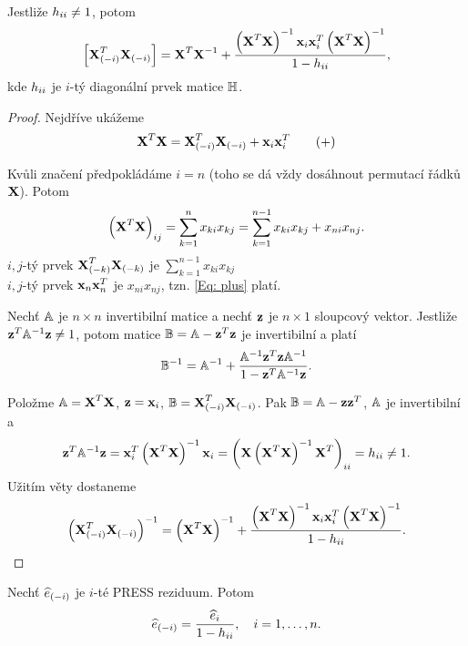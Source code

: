 \newcommand{\XtX}{\left( \X^T \X \right)^{-1}}

\begin{theorem}
Jestliže $h_{ii} \neq 1$, potom
$$
\left[ \Xmi^T \Xmi \right] = \X^T \inv{\X} + \frac{\XtX \x_i \x_i^T \XtX}{1 - \hii},
$$
kde $h_{ii}$ je $i$-tý diagonální prvek matice $\mathbb{H}$.
\end{theorem}

\begin{proof}
Nejdříve ukážeme
\begin{equation*}
	\textbf{X}^T \textbf{X} = \textbf{X}_{(-i)}^T \textbf{X}_{(-i)} + \textbf{x}_i \textbf{x}_i^T \tag{+} \label{Eq: plus}
\end{equation*}

\newcommand{\sumkn}{\sum_{k=1}^n}
\newcommand{\sumknn}{\sum_{k=1}^{n-1}}

Kvůli značení předpokládáme $i = n$ (toho se dá vždy dosáhnout permutací řádků $\textbf{X}$). Potom
$$
\left( \X^T \X \right)_{ij} = \sumkn x_{ki} x_{kj} = \sumknn x_{ki} x_{kj} + x_{ni} x_{nj}.
$$
$i,j$-tý prvek $\textbf{X}_{(-k)}^T \textbf{X}_{(-k)}$ je $\sumknn x_{ki} x_{kj}$ \\
$i,j$-tý prvek $\textbf{x}_n \textbf{x}_n^T$ je $x_{ni} x_{nj}$, tzn. \eqref{Eq: plus} platí.



\begin{theorem}
Nechť $\mathbb{A}$ je $n \times n$ invertibilní matice a nechť $\textbf{z}$ je $n \times 1$ sloupcový vektor. Jestliže $\textbf{z}^T \mathbb{A}^{-1} \textbf{z} \neq 1$, potom matice $\mathbb{B} = \mathbb{A} - \textbf{z}^T \textbf{z}$ je invertibilní a platí
$$
\mathbb{B}^{-1} = \mathbb{A}^{-1} + \frac{\mathbb{A}^{-1} \textbf{z}^T \textbf{z} \mathbb{A}^{-1}}{1 - \textbf{z}^T \mathbb{A}^{-1} \textbf{z}}.
$$
\end{theorem}

Položme $\mathbb{A} = \textbf{X}^T \textbf{X}$, $\textbf{z} = \textbf{x}_i$, $\mathbb{B} = \textbf{X}_{(-i)}^T \textbf{X}_{(-i)}$. Pak $\mathbb{B} = \mathbb{A} - \textbf{z} \textbf{z}^T$, $\mathbb{A}$ je invertibilní a
$$
\z^T \inv{\Am} \z = \x_i^T \XtX \x_i = \left( \X \XtX \X^T \right)_{ii} = \hii \neq 1.
$$
Užitím věty dostaneme
$$
\left(  \X_{(-i)}^T \X_{(-i)} \right)^{-1} = \XtX + \frac{\XtX \x_i \x_i^T \XtX}{1 - \hii}.
$$

\end{proof}

\begin{theorem}
	Nechť $\widehat{e}_{(-i)}$ je $i$-té PRESS reziduum. Potom
	$$
	\widehat{e}_{(-i)} = \frac{\widehat{e}_i}{1 - h_{ii}}, \quad i = 1, \dots, n.
	$$
\end{theorem}

